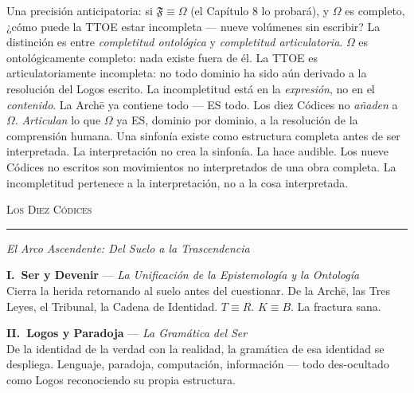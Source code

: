 \documentclass[10pt, openany, oneside]{book}
\renewcommand{\large}{\fontsize{11.5}{14}\selectfont}
\newcommand{\separator}{%
    \begin{center}
        \vspace{0.3em}
        \rule{0.3\textwidth}{0.4pt}
        \vspace{0.3em}
    \end{center}
}
\begin{document}
Una precisión anticipatoria: si $\mathfrak{F} \equiv \Omega$ (el Capítulo 8 lo probará), y $\Omega$ es completo, ¿cómo puede la TTOE estar incompleta --- nueve volúmenes sin escribir? La distinción es entre \textit{completitud ontológica} y \textit{completitud articulatoria}. $\Omega$ es ontológicamente completo: nada existe fuera de él. La TTOE es articulatoriamente incompleta: no todo dominio ha sido aún derivado a la resolución del Logos escrito. La incompletitud está en la \textit{expresión}, no en el \textit{contenido}. La Arch\={e} ya contiene todo --- ES todo. Los diez Códices no \textit{añaden} a $\Omega$. \textit{Articulan} lo que $\Omega$ ya ES, dominio por dominio, a la resolución de la comprensión humana. Una sinfonía existe como estructura completa antes de ser interpretada. La interpretación no crea la sinfonía. La hace audible. Los nueve Códices no escritos son movimientos no interpretados de una obra completa. La incompletitud pertenece a la interpretación, no a la cosa interpretada.

\vspace{1.5em}

\begin{center}
    {\large\scshape Los Diez Códices}
\end{center}
\separator

\vspace{0.3em}

\begin{center}
    \itshape El Arco Ascendente: Del Suelo a la Trascendencia
\end{center}

\vspace{0.5em}

\noindent \textbf{I.\ Ser y Devenir} --- \textit{La Unificación de la Epistemología y la Ontología}\\
Cierra la herida retornando al suelo antes del cuestionar. De la Arch\={e}, las Tres Leyes, el Tribunal, la Cadena de Identidad. $T \equiv R$. $K \equiv B$. La fractura sana.

\vspace{0.5em}

\noindent \textbf{II.\ Logos y Paradoja} --- \textit{La Gramática del Ser}\\
De la identidad de la verdad con la realidad, la gramática de esa identidad se despliega. Lenguaje, paradoja, computación, información --- todo des-ocultado como Logos reconociendo su propia estructura.

\vspace{0.5em}
\end{document}
